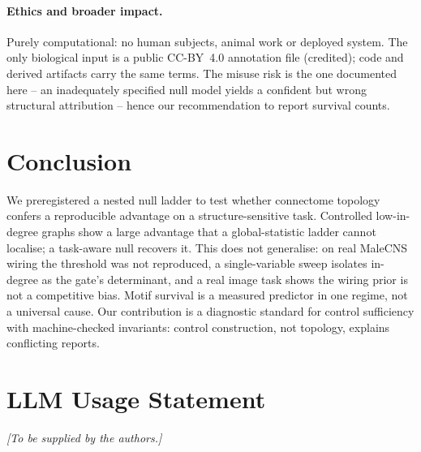 \documentclass[10pt,twocolumn,letterpaper]{article}
\begin{document}
\paragraph{Ethics and broader impact.}
Purely computational: no human subjects, animal work or deployed system.
The only biological input is a public CC-BY~4.0 annotation file (credited);
code and derived artifacts carry the same terms. The misuse risk is the one
documented here -- an inadequately specified null model yields a confident but
wrong structural attribution -- hence our recommendation to report survival
counts.

\section{Conclusion}
\label{sec:conclusion}

We preregistered a nested null ladder to test whether connectome topology
confers a reproducible advantage on a structure-sensitive task. Controlled
low-in-degree graphs show a large advantage that a global-statistic ladder
cannot localise; a task-aware null recovers it. This does not generalise: on
real MaleCNS wiring the threshold was not reproduced, a single-variable sweep
isolates in-degree as the gate's determinant, and a real image task shows the
wiring prior is not a competitive bias. Motif survival is a measured predictor
in one regime, not a universal cause. Our contribution is a diagnostic
standard for control sufficiency with machine-checked invariants: control
construction, not topology, explains conflicting reports.

\clearpage

\section*{LLM Usage Statement}
\emph{[To be supplied by the authors.]}

{
\small


}
\end{document}
